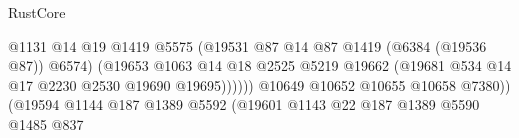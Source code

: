 \begin{lexlean}{RustCore}
\begin{coremodule}
                                                      @1131
                                                      @14
                                                      @19
                                                      @1419
                                                      @5575
                                                      (@19531
                                                        @87
                                                        @14
                                                        @87
                                                        @1419
                                                        (@6384 (@19536 @87))
                                                        @6574)
                                                      (@19653
                                                        @1063
                                                        @14
                                                        @18
                                                        @2525
                                                        @5219
                                                        @19662
                                                        (@19681
                                                          @534
                                                          @14
                                                          @17
                                                          @2230
                                                          @2530
                                                          @19690
                                                          @19695))))))
                                              @10649
                                              @10652
                                              @10655
                                              @10658
                                              @7380))
                                          (@19594
                                            @1144
                                            @187
                                            @1389
                                            @5592
                                            (@19601
                                              @1143
                                              @22
                                              @187
                                              @1389
                                              @5590
                                              @1485
                                              @837

\end{coremodule}
\end{lexlean}
